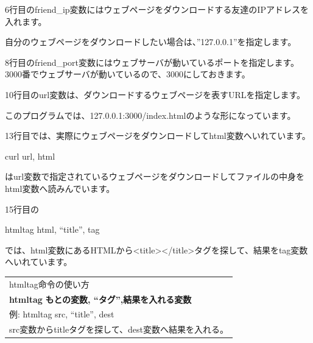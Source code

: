 \bigskip



\bigskip

6行目のfriend\_ip変数にはウェブページをダウンロードする友達のIPアドレスを入れます。

自分のウェブページをダウンロードしたい場合は、”127.0.0.1”を指定します。


\bigskip

8行目のfriend\_port変数にはウェブサーバが動いているポートを指定します。
3000番でウェブサーバが動いているので、3000にしておきます。


\bigskip

10行目のurl変数は、ダウンロードするウェブページを表すURLを指定します。

このプログラムでは、127.0.0.1:3000/index.htmlのような形になっています。


\bigskip

13行目では、実際にウェブページをダウンロードしてhtml変数へいれています。

curl url, html

はurl変数で指定されているウェブページをダウンロードしてファイルの中身をhtml変数へ読みんでいます。


\bigskip

\clearpage
15行目の

htmltag html, “title”, tag

では、html変数にあるHTMLから{\textless}title{\textgreater}{\textless}/title{\textgreater}タグを探して、結果をtag変数へいれています。


\bigskip








\begin{table}[htbp]
    \centering
    \begin{tabular}{|l|}
        \hline
        
        htmltag命令の使い方\\

        \textbf{htmltag} \textbf{もとの変数, “タグ”,結果を入れる変数}\\
        例: htmltag src, “title”, dest\\
        src変数からtitleタグを探して、dest変数へ結果を入れる。
        
        \\\hline
    \end{tabular}
\end{table}



